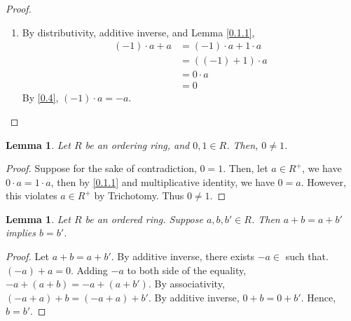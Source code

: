 \documentclass{article}
\newcommand{\SFTSOC}{Suppose for the sake of contradiction}
\newtheorem{lem}[thm]{Lemma}
\begin{document}
\begin{proof}
\begin{enumerate}
    By the second part of this proposition, which we have proven, $(-a)\cdot b= (-ab)$. Thus $(-a)(-b)+(-ab)=0$, and $((-a)(-b)+(-ab))+ab=0+ab$. By associativity and additive identity, $(-a)(-b)+(ab+(-ab))=ab$, and by additive inverse, $(-a)(-b)=ab$
    \item By distributivity, additive inverse, and Lemma \ref{0.1.1},
    \begin{equation}
        \begin{split}
            (-1)\cdot a+a &= (-1)\cdot a+1\cdot a\\
            &= ((-1)+1)\cdot a\\
            &= 0 \cdot a\\
            &= 0
        \end{split}
    \end{equation}
    By \ref{0.4}, $(-1)\cdot a=-a$.
\end{enumerate}
\end{proof}







\begin{lem} Let $R$ be an ordering ring, and $0,1\in R$. Then, $0\neq 1$.
\label{0.2}
\end{lem}

\begin{proof}
\SFTSOC, $0=1$. Then, let $a\in R^+$, we have $0\cdot a=1\cdot a$, then by \ref{0.1.1} and multiplicative identity, we have $0=a$. However, this violates $a\in R^+$ by Trichotomy. Thus $0\neq 1$. 
\end{proof}

\begin{lem}
\label{0.3}
Let $R$ be an ordered ring. Suppose $a, b, b' \in R$. Then $a+b=a+b'$ implies $b=b'$.
\end{lem}
\begin{proof}
Let $a+b=a+b'$. By additive inverse, there exists $-a \in $ such that. $(-a) + a = 0$. Adding $-a$ to both side of the equality, $-a + (a+b) = -a + (a+b')$. By associativity, $(-a+a)+b=(-a+a)+b'$. By additive inverse, $0+b=0+b'$. Hence, $b=b'$.
\end{proof}
\end{document}
